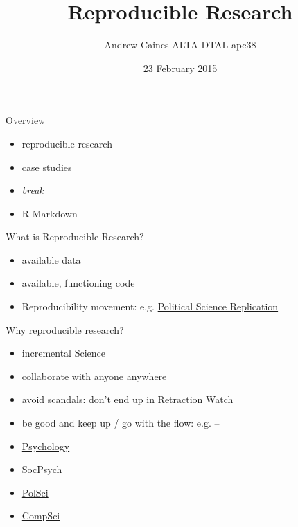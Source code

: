 \documentclass[ignorenonframetext,]{beamer}
\title{Reproducible Research}
\author{Andrew Caines \textbar{} ALTA-DTAL \textbar{} apc38}
\date{23 February 2015}
\begin{document}
\frame{\titlepage}

\begin{frame}{Overview}

\begin{itemize}[<+->]
\itemsep1pt\parskip0pt
\item
  reproducible research
\item
  case studies
\item
  \emph{break}
\item
  R Markdown
\end{itemize}

\end{frame}

\begin{frame}{What is Reproducible Research?}

\begin{itemize}[<+->]
\itemsep1pt\parskip0pt
\item
  available data
\item
  available, functioning code
\item
  Reproducibility movement: e.g.
  \href{https://politicalsciencereplication.wordpress.com/}{Political
  Science Replication}
\end{itemize}

\end{frame}

\begin{frame}{Why reproducible research?}

\begin{itemize}[<+->]
\itemsep1pt\parskip0pt
\item
  incremental Science
\item
  collaborate with anyone anywhere
\item
  avoid scandals: don't end up in
  \href{http://retractionwatch.com/}{Retraction Watch}
\item
  be good and keep up / go with the flow: e.g. --
\item
  \href{http://www.theguardian.com/science/head-quarters/2014/jan/24/the-changing-face-of-psychology}{Psychology}
\item
  \href{http://www.psycontent.com/content/l67413865317/?p=1dd5ebc505f9492c8fb93be3f7c713f3\&pi=0}{SocPsych}
\item
  \href{http://journals.cambridge.org/action/displayIssue?jid=PSC\&volumeId=47\&seriesId=0\&issueId=01}{PolSci}
\item
  \href{http://www.siam.org/news/news.php?id=2078}{CompSci}
\end{itemize}

\end{frame}
\end{document}
